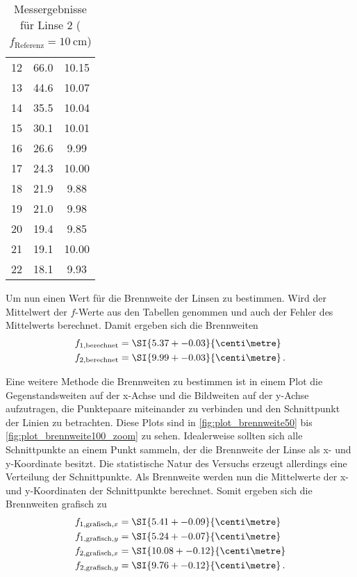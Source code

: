 \begin{table}
    \centering
    \caption{Messergebnisse für Linse 2 ($f_\text{Referenz}=\SI{10}{\centi\metre}$)}
    \begin{tabular}{S[table-format=2.0] S[table-format=2.1] S[table-format=2.2]}
        \toprule
         &  &  \\
         & 66.0 & 10.15 \\
        13 & 44.6 & 10.07 \\
        14 & 35.5 & 10.04 \\
        15 & 30.1 & 10.01 \\
        16 & 26.6 & 9.99 \\
        17 & 24.3 & 10.00 \\
        18 & 21.9 & 9.88 \\
        19 & 21.0 & 9.98 \\
        20 & 19.4 & 9.85 \\
        21 & 19.1 & 10.00 \\
        22 & 18.1 & 9.93 \\
        \bottomrule
    \end{tabular}
    \label{tab:brennweite100}
\end{table}

Um nun einen Wert für die Brennweite der Linsen zu bestimmen. 
Wird der Mittelwert der $f$-Werte aus den Tabellen genommen und auch der Fehler des Mittelwerts berechnet.
Damit ergeben sich die Brennweiten
\begin{align*}
    f_{1,\text{berechnet}} &= \SI{5.37+-0.03}{\centi\metre} \\
    f_{2,\text{berechnet}} &= \SI{9.99+-0.03}{\centi\metre} \, .
\end{align*}

Eine weitere Methode die Brennweiten zu bestimmen ist in einem Plot die Gegenstandsweiten auf der x-Achse und die Bildweiten auf der y-Achse aufzutragen, die Punktepaare miteinander zu verbinden und den Schnittpunkt der Linien zu betrachten.
Diese Plots sind in \autoref{fig:plot_brennweite50} bis \ref{fig:plot_brennweite100_zoom} zu sehen.
Idealerweise sollten sich alle Schnittpunkte an einem Punkt sammeln, der die Brennweite der Linse als x- und y-Koordinate besitzt.
Die statistische Natur des Versuchs erzeugt allerdings eine Verteilung der Schnittpunkte.
Als Brennweite werden nun die Mittelwerte der x- und y-Koordinaten der Schnittpunkte berechnet.
Somit ergeben sich die Brennweiten grafisch zu
\begin{align*}
    f_{1,\text{grafisch},x} &= \SI{5.41+-0.09}{\centi\metre} \\
    f_{1,\text{grafisch},y} &= \SI{5.24+-0.07}{\centi\metre} \\
    f_{2,\text{grafisch},x} &= \SI{10.08+-0.12}{\centi\metre} \\
    f_{2,\text{grafisch},y} &= \SI{9.76+-0.12}{\centi\metre} \, .
\end{align*}

